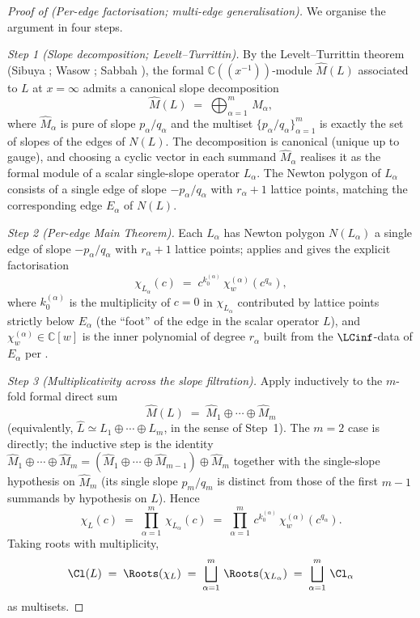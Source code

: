 \begin{proof}[Proof of  (Per-edge factorisation; multi-edge
generalisation)]
We organise the argument in four steps.

\smallskip
\textit{Step 1 (Slope decomposition; Levelt--Turrittin).}
By the Levelt--Turrittin theorem (Sibuya \cite{sibuya};
Wasow \cite[Ch.~VII]{wasow}; Sabbah \cite[Ch.~II,
Thm.~II.2.4]{sabbah-isomon}), the formal $\mathbb{C}((x^{-1}))$-module
$\widehat{M}(L)$ associated to $L$ at $x = \infty$ admits a canonical
slope decomposition
\[
   \widehat{M}(L) \;=\; \bigoplus_{\alpha=1}^{m}\,
   \widehat{M}_\alpha,
\]
where $\widehat{M}_\alpha$ is pure of slope $p_\alpha/q_\alpha$ and
the multiset $\{p_\alpha/q_\alpha\}_{\alpha=1}^{m}$ is exactly the set
of slopes of the edges of $N(L)$. The decomposition is canonical
(unique up to gauge), and choosing a cyclic vector in each summand
$\widehat{M}_\alpha$ realises it as the formal module of a scalar
single-slope operator $L_\alpha$. The Newton polygon of $L_\alpha$
consists of a single edge of slope $-p_\alpha/q_\alpha$ with
$r_\alpha + 1$ lattice points, matching the corresponding edge
$E_\alpha$ of $N(L)$.

\smallskip
\textit{Step 2 (Per-edge Main Theorem).}
Each $L_\alpha$ has Newton polygon $N(L_\alpha)$ a single edge of
slope $-p_\alpha/q_\alpha$ with $r_\alpha + 1$ lattice points;
 applies and gives the explicit factorisation
\[
   \chi_{L_\alpha}(c)
   \;=\;
   c^{k_0^{(\alpha)}}\, \chi_w^{(\alpha)}(c^{q_\alpha}),
\]
where $k_0^{(\alpha)}$ is the multiplicity of $c = 0$ in $\chi_{L_\alpha}$
contributed by lattice points strictly below $E_\alpha$ (the
``foot'' of the edge in the scalar operator $L$), and
$\chi_w^{(\alpha)} \in \mathbb{C}[w]$ is the inner polynomial of
degree $r_\alpha$ built from the $\LCinf$-data of $E_\alpha$ per
.

\smallskip
\textit{Step 3 (Multiplicativity across the slope filtration).}
Apply  inductively to the $m$-fold
formal direct sum
\[
   \widehat{M}(L) \;=\; \widehat{M}_1 \oplus \cdots \oplus \widehat{M}_m
\]
(equivalently, $\widehat{L} \simeq L_1 \oplus \cdots \oplus L_m$, in
the sense of Step~1). The $m = 2$ case is 
directly; the inductive step is the identity $\widehat{M}_1 \oplus
\cdots \oplus \widehat{M}_m = (\widehat{M}_1 \oplus \cdots \oplus
\widehat{M}_{m-1}) \oplus \widehat{M}_m$ together with the
single-slope hypothesis on $\widehat{M}_m$ (its single slope
$p_m/q_m$ is distinct from those of the first $m - 1$ summands by
hypothesis on $L$). Hence
\[
   \chi_L(c)
   \;=\;
   \prod_{\alpha=1}^{m}\, \chi_{L_\alpha}(c)
   \;=\;
   \prod_{\alpha=1}^{m}\,
   c^{k_0^{(\alpha)}}\, \chi_w^{(\alpha)}(c^{q_\alpha}).
\]
Taking roots with multiplicity,
\[
   \Cl(L) \;=\; \Roots(\chi_L)
   \;=\;
   \bigsqcup_{\alpha = 1}^{m}\, \Roots(\chi_{L_\alpha})
   \;=\;
   \bigsqcup_{\alpha = 1}^{m}\, \Cl_\alpha
\]
as multisets.


\end{proof}
